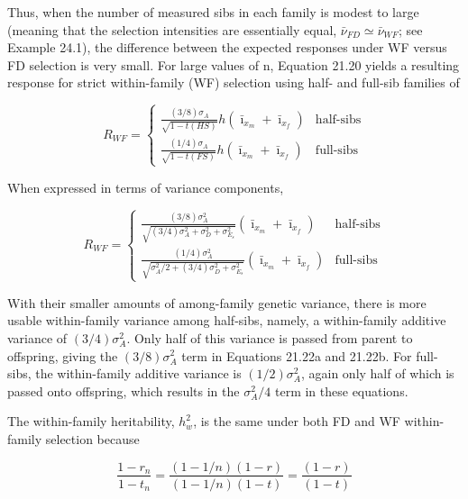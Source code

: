 \documentclass{article}
\begin{document}
Thus, when the number of measured sibs in each family is modest to large (meaning that the selection intensities are essentially equal,  $ \bar{\nu}_{FD} \simeq \bar{\nu}_{WF} $; see Example 24.1), the difference between the expected responses under WF versus FD selection is very small. For large values of n, Equation 21.20 yields a resulting response for strict within-family (WF) selection using half- and full-sib families of

\begin{equation}
R_{WF}=\left\{\begin{array}{ll}\frac{\left(3/8\right)\sigma_{A}}{\sqrt{1-t(HS)}}h\left(\bar{\imath}_{x_{m}}+\bar{\imath}_{x_{f}}\right)&\text{half-sibs}\\\frac{\left(1/4\right)\sigma_{A}}{\sqrt{1-t(FS)}}h\left(\bar{\imath}_{x_{m}}+\bar{\imath}_{x_{f}}\right)&\text{full-sibs}\end{array}\right.
\tag{21.22a}
\label{eq:21_22a}
\end{equation}

When expressed in terms of variance components,

\begin{equation}
R_{WF}=\left\{\begin{array}{ll}\frac{(3/8)\sigma_{A}^{2}}{\sqrt{(3/4)\sigma_{A}^{2}+\sigma_{D}^{2}+\sigma_{E_{s}}^{2}}}\left(\bar{\imath}_{x_{m}}+\bar{\imath}_{x_{f}}\right)&\text{half-sibs}\\\frac{(1/4)\sigma_{A}^{2}}{\sqrt{\sigma_{A}^{2}/2+(3/4)\sigma_{D}^{2}+\sigma_{E_{s}}^{2}}}\left(\bar{\imath}_{x_{m}}+\bar{\imath}_{x_{f}}\right)&\text{full-sibs}\end{array}\right.
\tag{21.22b}
\label{eq:21_22b}
\end{equation}

With their smaller amounts of among-family genetic variance, there is more usable within-family variance among half-sibs, namely, a within-family additive variance of  $ (3/4)\sigma_{A}^{2} $. Only half of this variance is passed from parent to offspring, giving the  $ (3/8)\sigma_{A}^{2} $ term in Equations 21.22a and 21.22b. For full-sibs, the within-family additive variance is  $ (1/2)\sigma_{A}^{2} $, again only half of which is passed onto offspring, which results in the  $ \sigma_{A}^{2}/4 $ term in these equations.

The within-family heritability,  $ h_{w}^{2} $, is the same under both FD and WF within-family selection because

\begin{equation}
\frac{1-r_{n}}{1-t_{n}}=\frac{(1-1/n)(1-r)}{(1-1/n)(1-t)}=\frac{(1-r)}{(1-t)}
\end{equation}
\end{document}
